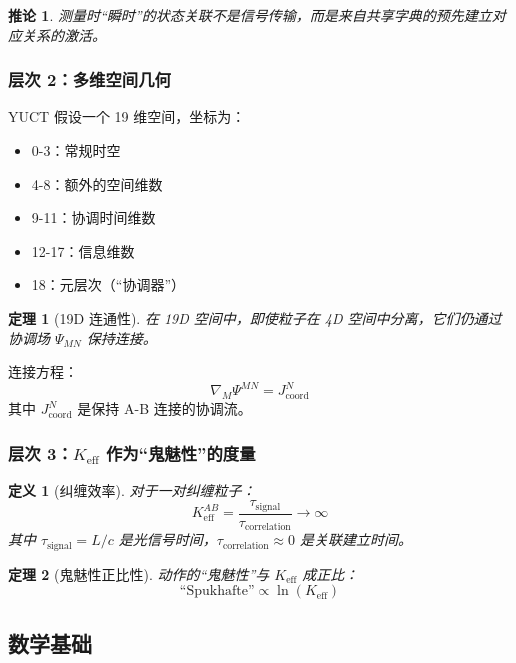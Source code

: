 \documentclass[11pt,a4paper]{article}
\newtheorem{theorem}{定理}
\newtheorem{definition}{定义}
\newtheorem{corollary}{推论}
\begin{document}
	\begin{corollary}
		测量时“瞬时”的状态关联不是信号传输，而是来自共享字典的预先建立对应关系的激活。
	\end{corollary}
	
	\subsubsection{层次 2：多维空间几何}
	YUCT 假设一个 19 维空间，坐标为：
	\begin{itemize}
		\item 0-3：常规时空
		\item 4-8：额外的空间维数
		\item 9-11：协调时间维数
		\item 12-17：信息维数
		\item 18：元层次（“协调器”）
	\end{itemize}
	
	\begin{theorem}[19D 连通性]
		在 19D 空间中，即使粒子在 4D 空间中分离，它们仍通过协调场 $\Psi_{MN}$ 保持连接。
	\end{theorem}
	
	连接方程：
	\begin{equation}
		\nabla_M \Psi^{MN} = J^N_{\text{coord}}
	\end{equation}
	其中 $J^N_{\text{coord}}$ 是保持 A-B 连接的协调流。
	
	\subsubsection{层次 3：$K_{\mathrm{eff}}$ 作为“鬼魅性”的度量}
	\begin{definition}[纠缠效率]
		对于一对纠缠粒子：
		\begin{equation}
			K_{\mathrm{eff}}^{AB} = \frac{\tau_{\text{signal}}}{\tau_{\text{correlation}}} \to \infty
		\end{equation}
		其中 $\tau_{\text{signal}} = L/c$ 是光信号时间，$\tau_{\text{correlation}} \approx 0$ 是关联建立时间。
	\end{definition}
	
	\begin{theorem}[鬼魅性正比性]
		动作的“鬼魅性”与 $K_{\mathrm{eff}}$ 成正比：
		\begin{equation}
			\text{“Spukhafte”} \propto \ln(K_{\mathrm{eff}})
		\end{equation}
	\end{theorem}
	
	\subsection{数学基础}
	\label{subsec:math-foundation}
	
\end{document}
